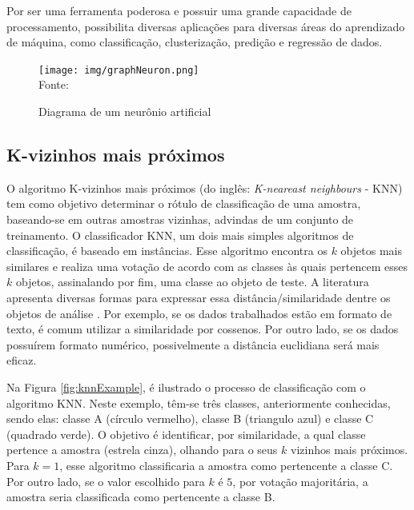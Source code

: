  Por ser uma ferramenta poderosa e possuir uma grande capacidade de processamento, possibilita diversas aplicações para diversas áreas do aprendizado de máquina, como classificação, clusterização, predição e regressão de dados.

\begin{figure}[ht!]
\caption{Diagrama de um neurônio artificial}
\label{fig:graphNeuron}
\centering
\texttt{[image: img/graphNeuron.png]}
{\fontsize{11pt}{\baselineskip}\selectfont
\\Fonte: \cite{Rauber2005}
}
\end{figure}

\subsection{K-vizinhos mais próximos}
O algoritmo K-vizinhos mais próximos (do inglês: \textit{K-neareast neighbours} - KNN) tem como objetivo determinar o rótulo de classificação de uma amostra, baseando-se em outras amostras vizinhas, advindas de um conjunto de treinamento. O classificador KNN, um dois mais simples algoritmos de classificação, é baseado em
instâncias. Esse algoritmo encontra os $k$ objetos mais similares e realiza uma votação de acordo com as classes às quais pertencem esses $k$ objetos, assinalando por fim, uma classe ao objeto de teste. A literatura apresenta diversas formas para expressar essa distância/similaridade dentre os objetos de análise \citep{fukunaga1975knn, duda1973pattern}. Por exemplo, se os dados trabalhados estão em formato de texto, é comum utilizar a similaridade por cossenos. Por outro lado, se os dados possuírem formato numérico, possivelmente a distância euclidiana será mais eficaz.

Na Figura \ref{fig:knnExample}, é ilustrado o processo de classificação com o algoritmo KNN. Neste exemplo, têm-se três classes, anteriormente conhecidas, sendo elas: classe A (círculo vermelho), classe B (triangulo azul) e classe C (quadrado verde). O objetivo é identificar, por similaridade, a qual classe pertence a amostra (estrela cinza), olhando para o seus $k$ vizinhos mais próximos. Para $k = 1$, esse algoritmo classificaria a amostra como pertencente a classe C. Por outro lado, se o valor escolhido para $k$ é $5$, por votação majoritária, a amostra seria classificada como pertencente a classe B.

